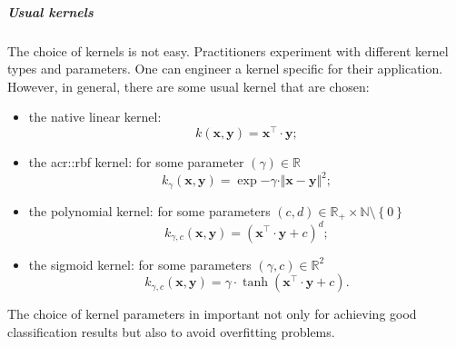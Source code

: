                 \subparagraph{Usual kernels}
                    The choice of kernels is not easy.
                    Practitioners experiment with different kernel types and parameters.
                    One can engineer a kernel specific for their application.
                    However, in general, there are some usual kernel that are chosen:
                    \begin{itemize}
                        \item the native linear kernel:
                        \begin{equation}
                            \label{eq::linear_kernel}
                            k(\bm{x}, \bm{y}) = \bm{x}^\intercal \cdot \bm{y};
                        \end{equation}
                        \item the \gls{acr::rbf} kernel: for some parameter $(\gamma) \in \mathbb{R}$
                        \begin{equation}
                            \label{eq::rbf_kernel}
                            k_{\gamma}(\bm{x}, \bm{y}) = \exp{-\gamma \cdot \Vert \bm{x} - \bm{y} \Vert^2};
                        \end{equation}
                        \item the polynomial kernel: for some parameters $(c, d) \in \mathbb{R}_+ \times \mathbb{N} \setminus \left\{0\right\} $
                        \begin{equation}
                            \label{eq::polynomial_kernel}
                            k_{\gamma, c}(\bm{x}, \bm{y}) = (\bm{x}^\intercal \cdot \bm{y} + c)^d;
                        \end{equation}
                        \item the sigmoid kernel: for some parameters $(\gamma, c) \in \mathbb{R}^2$
                        \begin{equation}
                            \label{eq::sigmoid_kernel}
                            k_{\gamma, c}(\bm{x}, \bm{y}) = \gamma \cdot \tanh(\bm{x}^\intercal \cdot \bm{y} + c).
                        \end{equation}
                    \end{itemize}
                    The choice of kernel parameters in important not only for achieving good classification results but also to avoid overfitting problems.

